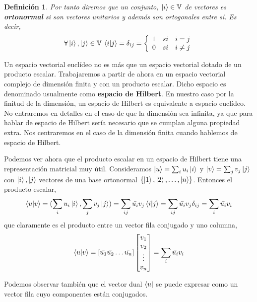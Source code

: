 \documentclass[a4paper]{article}
\newtheorem{deff}{Definición}[section]
\numberwithin{equation}{section}
\begin{document}
\begin{deff}Por tanto diremos que un conjunto, $\ket{i} \in \mathbb{V}$ de vectores es \textbf{ortonormal} si son vectores unitarios y además son ortogonales entre sí. Es decir,
\begin{equation}
\forall \ket{i},\ket{j} \in \mathbb{V} \:
\braket{i|j} = \delta_{ij} = \left\{ 
\begin{array}{lcc}
1 & si & i = j \\
0 & si & i \neq j
\end{array} \right.
\end{equation}
\end{deff}

Un espacio vectorial euclídeo no es más que un espacio vectorial dotado de un producto escalar. Trabajaremos a partir de ahora en un espacio vectorial complejo de dimensión finita y con un producto escalar. Dicho espacio es denominado usualmente como \textbf{espacio de Hilbert}. En nuestro caso por la finitud de la dimensión, un espacio de Hilbert es equivalente a espacio euclídeo.
No entraremos en detalles en el caso de que la dimensión sea infinita, ya que para hablar de espacio de Hilbert sería necesario que se cumplan alguna propiedad extra. Nos centraremos en el caso de la dimensión finita cuando hablemos de espacio de Hilbert.

Podemos ver ahora que el producto escalar en un espacio de Hilbert tiene una representación matricial muy útil.
Consideramos $\ket{u} = \sum_i u_i\ket{i}$ y $\ket{v} = \sum_j v_j\ket{j}$ con $\ket{i}, \ket{j}$ vectores de una base ortonormal $\{ \ket{1}, \ket{2}, \ldots, \ket{n} \}$.
Entonces el producto escalar,
\begin{equation}
\braket{u|v} = (\sum_i u_i\ket{i}, \sum_j v_j\ket{j}) = \sum_{ij} \bar{u_i} v_j\braket{i|j} = \sum_{ij} \bar{u_i} v_j\delta_{ij} = \sum_i \bar{u_i} v_i
\end{equation}
que claramente es el producto entre un vector fila conjugado y uno columna,
\begin{equation}
\braket{u|v} =
\left[ \bar{u_1}  \bar{u_2}  \ldots  \bar{u_n} \right]
\begin{bmatrix}
v_1 \\ v_2 \\ \vdots \\ v_n
\end{bmatrix} =
\sum_i \bar{u_i} v_i
\end{equation}

Podemos observar también que el vector dual $\bra{u}$ se puede expresar como un vector fila cuyo componentes están conjugados.
\end{document}
